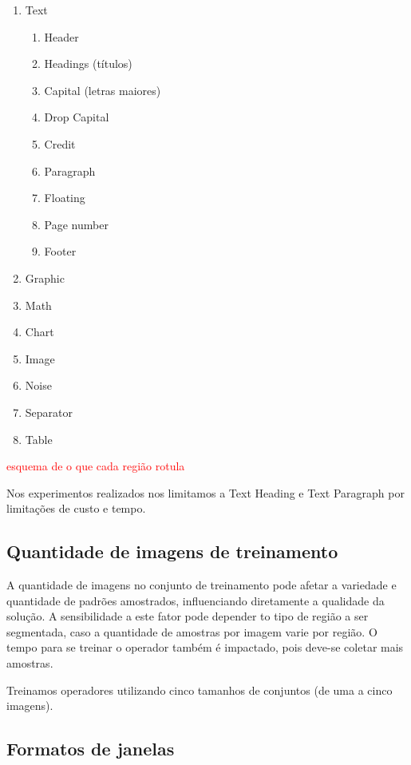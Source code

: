 \documentclass[a4paper,11pt]{article}
\newcommand{\TODO}[1]{\textcolor{red}{#1}}
\begin{document}
    \begin{enumerate}
      \item Text
      \begin{enumerate}
        \item Header 
        \item Headings (títulos)
        \item Capital (letras maiores)
        \item Drop Capital
        \item Credit
        \item Paragraph
        \item Floating
        \item Page number
        \item Footer
      \end{enumerate}
      \item Graphic
      \item Math
      \item Chart
      \item Image
      \item Noise
      \item Separator
      \item Table
    \end{enumerate}

    \TODO{esquema de o que cada região rotula}

    Nos experimentos realizados nos limitamos a Text Heading e Text Paragraph por limitações de custo e tempo.

  \subsection{Quantidade de imagens de treinamento}

    A quantidade de imagens no conjunto de treinamento pode afetar a variedade e quantidade de padrões amostrados, influenciando diretamente a qualidade da solução. A sensibilidade a este fator pode depender to tipo de região a ser segmentada, caso a quantidade de amostras por imagem varie por região. O tempo para se treinar o operador também é impactado, pois deve-se coletar mais amostras.

    Treinamos operadores utilizando cinco tamanhos de conjuntos (de uma a cinco imagens).

  \subsection{Formatos de janelas}
\end{document}
